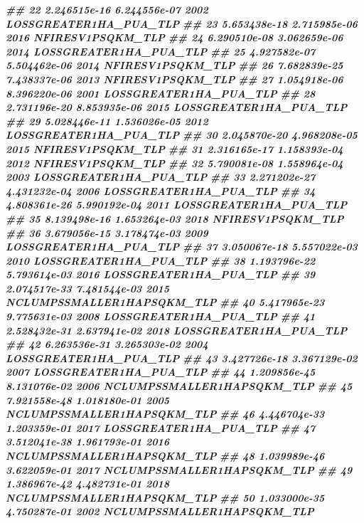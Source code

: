 \documentclass[10pt,landscape,a3paper]{article}
\newenvironment{Shaded}{\begin{snugshade}}{\end{snugshade}}
\newcommand{\DocumentationTok}[1]{\textcolor[rgb]{0.56,0.35,0.01}{\textbf{\textit{#1}}}}
\begin{document}
\begin{Shaded}
\begin{Highlighting}[]
\DocumentationTok{\#\# 22 2.246515e{-}16 6.244556e{-}07 2002     LOSSGREATER1HA\_PUA\_TLP}
\DocumentationTok{\#\# 23 5.653438e{-}18 2.715985e{-}06 2016          NFIRESV1PSQKM\_TLP}
\DocumentationTok{\#\# 24 6.290510e{-}08 3.062659e{-}06 2014     LOSSGREATER1HA\_PUA\_TLP}
\DocumentationTok{\#\# 25 4.927582e{-}07 5.504462e{-}06 2014          NFIRESV1PSQKM\_TLP}
\DocumentationTok{\#\# 26 7.682839e{-}25 7.438337e{-}06 2013          NFIRESV1PSQKM\_TLP}
\DocumentationTok{\#\# 27 1.054918e{-}06 8.396220e{-}06 2001     LOSSGREATER1HA\_PUA\_TLP}
\DocumentationTok{\#\# 28 2.731196e{-}20 8.853935e{-}06 2015     LOSSGREATER1HA\_PUA\_TLP}
\DocumentationTok{\#\# 29 5.028446e{-}11 1.536026e{-}05 2012     LOSSGREATER1HA\_PUA\_TLP}
\DocumentationTok{\#\# 30 2.045870e{-}20 4.968208e{-}05 2015          NFIRESV1PSQKM\_TLP}
\DocumentationTok{\#\# 31 2.316165e{-}17 1.158393e{-}04 2012          NFIRESV1PSQKM\_TLP}
\DocumentationTok{\#\# 32 5.790081e{-}08 1.558964e{-}04 2003     LOSSGREATER1HA\_PUA\_TLP}
\DocumentationTok{\#\# 33 2.271202e{-}27 4.431232e{-}04 2006     LOSSGREATER1HA\_PUA\_TLP}
\DocumentationTok{\#\# 34 4.808361e{-}26 5.990192e{-}04 2011     LOSSGREATER1HA\_PUA\_TLP}
\DocumentationTok{\#\# 35 8.139498e{-}16 1.653264e{-}03 2018          NFIRESV1PSQKM\_TLP}
\DocumentationTok{\#\# 36 3.679056e{-}15 3.178474e{-}03 2009     LOSSGREATER1HA\_PUA\_TLP}
\DocumentationTok{\#\# 37 3.050067e{-}18 5.557022e{-}03 2010     LOSSGREATER1HA\_PUA\_TLP}
\DocumentationTok{\#\# 38 1.193796e{-}22 5.793614e{-}03 2016     LOSSGREATER1HA\_PUA\_TLP}
\DocumentationTok{\#\# 39 2.074517e{-}33 7.481544e{-}03 2015 NCLUMPSSMALLER1HAPSQKM\_TLP}
\DocumentationTok{\#\# 40 5.417965e{-}23 9.775631e{-}03 2008     LOSSGREATER1HA\_PUA\_TLP}
\DocumentationTok{\#\# 41 2.528432e{-}31 2.637941e{-}02 2018     LOSSGREATER1HA\_PUA\_TLP}
\DocumentationTok{\#\# 42 6.263536e{-}31 3.265303e{-}02 2004     LOSSGREATER1HA\_PUA\_TLP}
\DocumentationTok{\#\# 43 3.427726e{-}18 3.367129e{-}02 2007     LOSSGREATER1HA\_PUA\_TLP}
\DocumentationTok{\#\# 44 1.209856e{-}45 8.131076e{-}02 2006 NCLUMPSSMALLER1HAPSQKM\_TLP}
\DocumentationTok{\#\# 45 7.921558e{-}48 1.018180e{-}01 2005 NCLUMPSSMALLER1HAPSQKM\_TLP}
\DocumentationTok{\#\# 46 4.446704e{-}33 1.203359e{-}01 2017     LOSSGREATER1HA\_PUA\_TLP}
\DocumentationTok{\#\# 47 3.512041e{-}38 1.961793e{-}01 2016 NCLUMPSSMALLER1HAPSQKM\_TLP}
\DocumentationTok{\#\# 48 1.039989e{-}46 3.622059e{-}01 2017 NCLUMPSSMALLER1HAPSQKM\_TLP}
\DocumentationTok{\#\# 49 1.386967e{-}42 4.482731e{-}01 2018 NCLUMPSSMALLER1HAPSQKM\_TLP}
\DocumentationTok{\#\# 50 1.033000e{-}35 4.750287e{-}01 2002 NCLUMPSSMALLER1HAPSQKM\_TLP}

\end{Highlighting}
\end{Shaded}
\end{document}
